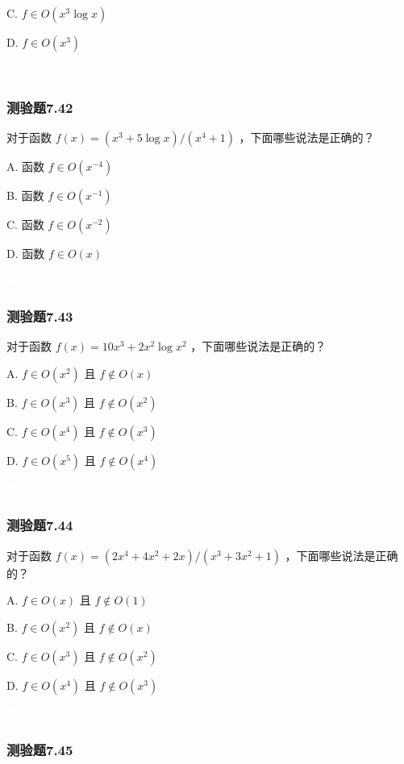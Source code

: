 \documentclass[UTF8, heading=true]{ctexart}
\begin{document}
C. $f \in O\left(x^3 \log x\right)$

D. $ f \in O\left(x^3\right)$

\textcolor{white}{答案：CD}

\subsubsection{测验题7.42}

对于函数 $f(x)=\left(x^3+5 \log x\right) /\left(x^4+1\right)$ ，下面哪些说法是正确的？

A. 函数 $f \in O\left(x^{-4}\right)$

B. 函数 $f \in O\left(x^{-1}\right)$

C. 函数 $f \in O\left(x^{-2}\right)$

D.  函数 $f \in O(x)$



\textcolor{white}{答案：BD}

\subsubsection{测验题7.43}

对于函数 $f(x)=10 x^3+2 x^2 \log x^2$ ，下面哪些说法是正确的？

A. $f \in O\left(x^2\right)$ 且 $f \notin O(x)$

B. $f \in O\left(x^3\right)$ 且 $f \notin O\left(x^2\right)$

C. $f \in O\left(x^4\right)$ 且 $f \notin O\left(x^3\right)$

D.  $f \in O\left(x^5\right)$ 且 $f \notin O\left(x^4\right)$

\textcolor{white}{答案：B}

\subsubsection{测验题7.44}

对于函数 $f(x)=\left(2 x^4+4 x^2+2 x\right) /\left(x^3+3 x^2+1\right)$ ，下面哪些说法是正确的？

A. $f \in O(x)$ 且 $f \notin O(1)$

B. $f \in O\left(x^2\right)$ 且 $f \notin O(x)$

C. $f \in O\left(x^3\right)$ 且 $f \notin O\left(x^2\right)$

D. $ f \in O\left(x^4\right)$ 且 $f \notin O\left(x^3\right)$

\textcolor{white}{答案：A}


\subsubsection{测验题7.45}
\end{document}
